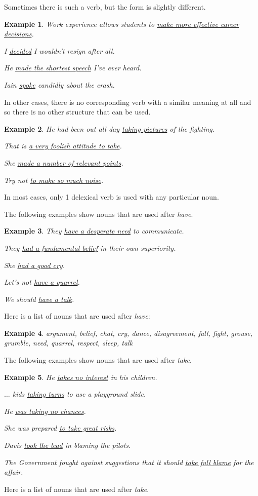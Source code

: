 \documentclass[oneside]{book}
\numberwithin{equation}{section}
\newtheorem{example}{Example}[section]
\begin{document}
Sometimes there is such a verb, but the form is slightly different.
\begin{example}
    Work experience allows students to \underline{make more effective career decisions}.
    
    I \underline{decided} I wouldn't resign after all.
    
    He \underline{made the shortest speech} I've ever heard.
    
    Iain \underline{spoke} candidly about the crash.
\end{example}
In other cases, there is no corresponding verb with a similar meaning at all and so there is no other structure that can be used.
\begin{example}
    He had been out all day \underline{taking pictures} of the fighting.
    
    That is \underline{a very foolish attitude to take}.
    
    She \underline{made a number of relevant points}.
    
    Try not \underline{to make so much noise}.
\end{example}
%
\noindent{} In most cases, only 1 delexical verb is used with any particular noun.

%
The following examples show nouns that are used after \textit{have}.
\begin{example}
    They \underline{have a desperate need} to communicate.
    
    They \underline{had a fundamental belief} in their own superiority.
    
    She \underline{had a good cry}.
    
    Let's not \underline{have a quarrel}.
    
    We should \underline{have a talk}.
\end{example}
Here is a list of nouns that are used after \textit{have}:
\begin{example}
    argument, belief, chat, cry, dance, disagreement, fall, fight, grouse, grumble, need, quarrel, respect, sleep, talk
\end{example}
%
\noindent{} The following examples show nouns that are used after \textit{take}.
\begin{example}
    He \underline{takes no interest} in his children.
    
    $\ldots$ kids \underline{taking turns} to use a playground slide.
    
    He \underline{was taking no chances}.
    
    She was prepared \underline{to take great risks}.
    
    Davis \underline{took the lead} in blaming the pilots.
    
    The Government fought against suggestions that it should \underline{take full blame} for the affair.
\end{example}
Here is a list of nouns that are used after \textit{take}.
\end{document}
